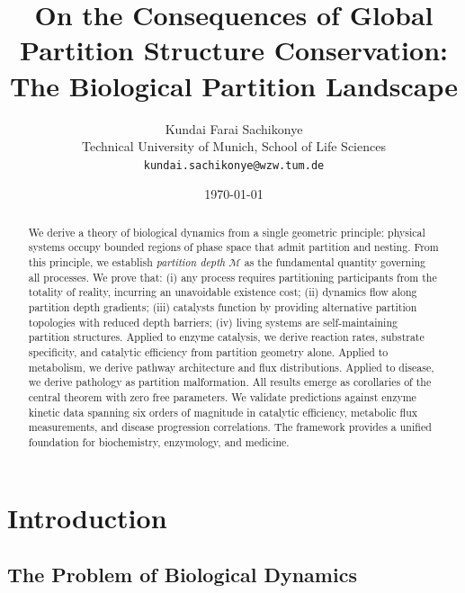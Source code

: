 ﻿\documentclass[twocolumn,10pt,a4paper]{article}
\theoremstyle{definition}
\theoremstyle{remark}
\newcommand{\Depth}{\mathcal{M}}
\begin{document}
\title{\textbf{On the Consequences of Global Partition Structure Conservation:\\  The Biological Partition Landscape}}

\author{
Kundai Farai Sachikonye\\
Technical University of Munich, School of Life Sciences\\
\texttt{kundai.sachikonye@wzw.tum.de}
}

\date{\today}

\maketitle

\begin{abstract}
\noindent We derive a theory of biological dynamics from a single geometric principle: physical systems occupy bounded regions of phase space that admit partition and nesting. From this principle, we establish \emph{partition depth} $\Depth$ as the fundamental quantity governing all processes. We prove that: (i) any process requires partitioning participants from the totality of reality, incurring an unavoidable existence cost; (ii) dynamics flow along partition depth gradients; (iii) catalysts function by providing alternative partition topologies with reduced depth barriers; (iv) living systems are self-maintaining partition structures. Applied to enzyme catalysis, we derive reaction rates, substrate specificity, and catalytic efficiency from partition geometry alone. Applied to metabolism, we derive pathway architecture and flux distributions. Applied to disease, we derive pathology as partition malformation. All results emerge as corollaries of the central theorem with zero free parameters. We validate predictions against enzyme kinetic data spanning six orders of magnitude in catalytic efficiency, metabolic flux measurements, and disease progression correlations. The framework provides a unified foundation for biochemistry, enzymology, and medicine.
\end{abstract}

\section{Introduction}
\label{sec:introduction}

\subsection{The Problem of Biological Dynamics}
\end{document}
